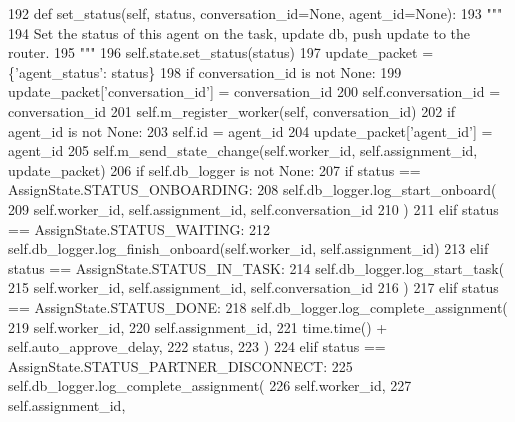 \begin{DoxyCode}
192     \textcolor{keyword}{def }set\_status(self, status, conversation\_id=None, agent\_id=None):
193         \textcolor{stringliteral}{"""}
194 \textcolor{stringliteral}{        Set the status of this agent on the task, update db, push update to the router.}
195 \textcolor{stringliteral}{        """}
196         self.state.set\_status(status)
197         update\_packet = \{\textcolor{stringliteral}{'agent\_status'}: status\}
198         \textcolor{keywordflow}{if} conversation\_id \textcolor{keywordflow}{is} \textcolor{keywordflow}{not} \textcolor{keywordtype}{None}:
199             update\_packet[\textcolor{stringliteral}{'conversation\_id'}] = conversation\_id
200             self.conversation\_id = conversation\_id
201             self.m\_register\_worker(self, conversation\_id)
202         \textcolor{keywordflow}{if} agent\_id \textcolor{keywordflow}{is} \textcolor{keywordflow}{not} \textcolor{keywordtype}{None}:
203             self.id = agent\_id
204             update\_packet[\textcolor{stringliteral}{'agent\_id'}] = agent\_id
205         self.m\_send\_state\_change(self.worker\_id, self.assignment\_id, update\_packet)
206         \textcolor{keywordflow}{if} self.db\_logger \textcolor{keywordflow}{is} \textcolor{keywordflow}{not} \textcolor{keywordtype}{None}:
207             \textcolor{keywordflow}{if} status == AssignState.STATUS\_ONBOARDING:
208                 self.db\_logger.log\_start\_onboard(
209                     self.worker\_id, self.assignment\_id, self.conversation\_id
210                 )
211             \textcolor{keywordflow}{elif} status == AssignState.STATUS\_WAITING:
212                 self.db\_logger.log\_finish\_onboard(self.worker\_id, self.assignment\_id)
213             \textcolor{keywordflow}{elif} status == AssignState.STATUS\_IN\_TASK:
214                 self.db\_logger.log\_start\_task(
215                     self.worker\_id, self.assignment\_id, self.conversation\_id
216                 )
217             \textcolor{keywordflow}{elif} status == AssignState.STATUS\_DONE:
218                 self.db\_logger.log\_complete\_assignment(
219                     self.worker\_id,
220                     self.assignment\_id,
221                     time.time() + self.auto\_approve\_delay,
222                     status,
223                 )
224             \textcolor{keywordflow}{elif} status == AssignState.STATUS\_PARTNER\_DISCONNECT:
225                 self.db\_logger.log\_complete\_assignment(
226                     self.worker\_id,
227                     self.assignment\_id,

\end{DoxyCode}
